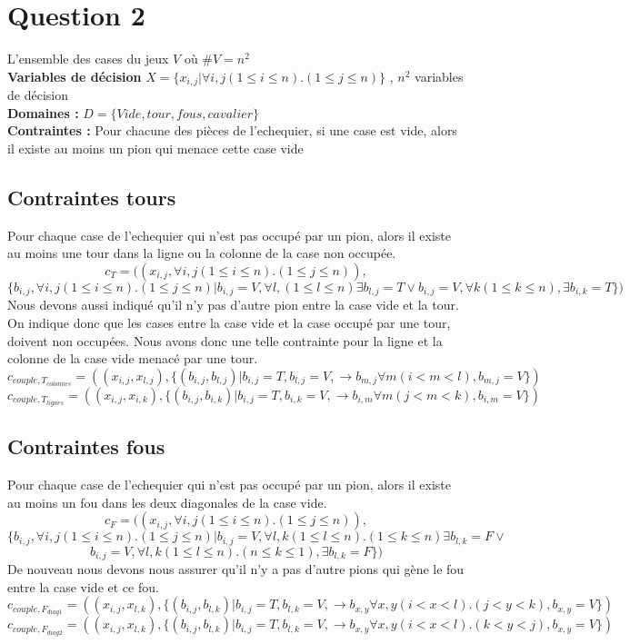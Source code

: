 \documentclass[a4paper,10pt]{article}
\begin{document}
\section{Question 2}
L'ensemble des cases du jeux $V$ où $ \#V = n^2$ \\
\textbf {Variables de décision} $ X = \{x_{i,j} | \forall i,j (1 \leq i \leq n).(1 \leq j \leq n)\}$ , $n^2$ variables de décision \\
\textbf{Domaines : }
$ D = \{Vide, tour, fous, cavalier \} $\\
\textbf{Contraintes : } Pour chacune des pièces de l'echequier, si une case est vide, alors il existe au moins un pion qui menace cette case vide

\subsection{Contraintes tours}
	Pour chaque case de l'echequier qui n'est pas occupé par un pion, alors il existe au moins une tour dans la ligne ou la colonne de la case non occupée.
$$ c_T = ((x_{i,j}, \forall i,j (1 \leq i \leq n).(1 \leq j \leq n)),$$ $$\{b_{i,j}, \forall i,j (1 \leq i \leq n).(1 \leq j \leq n)|b_{i,j} = V, \forall l, (1 \leq l \leq n) \exists b_{l,j} = T \lor b_{i,j} = V, \forall k (1 \leq k \leq n), \exists b_{i,k} = T\})  $$
	Nous devons aussi indiqué qu'il n'y pas d'autre pion entre la case vide et la tour.  On indique donc que les cases entre la case vide et la case occupé par une tour, doivent non occupées. Nous avons donc une telle contrainte pour la ligne et la colonne de la case vide menacé par une tour.
$$ c_{couple,T_{colonnes}} = ((x_{i,j}, x_{l,j}), \{(b_{i,j}, b_{l,j})|b_{i,j} = T, b_{l,j} = V, \rightarrow b_{m,j} \forall m (i < m < l), b_{m,j} = V \})$$
$$ c_{couple,T_{lignes}} = ((x_{i,j}, x_{i,k}), \{(b_{i,j}, b_{i,k})|b_{i,j} = T, b_{i,k} = V, \rightarrow b_{i,m} \forall m (j < m < k), b_{i,m} = V \})$$

\subsection{Contraintes fous}
	Pour chaque case de l'echequier qui n'est pas occupé par un pion, alors il existe au moins un fou dans les deux diagonales de la case vide.
$$ c_F = ((x_{i,j}, \forall i,j (1 \leq i \leq n).(1 \leq j \leq n)),$$ $$\{b_{i,j},\forall i,j (1 \leq i \leq n).(1 \leq j \leq n)|b_{i,j} = V, \forall l,k (1 \leq l \leq n).(1 \leq k \leq n) \exists b_{l,k} = F \lor$$ $$b_{i,j} = V, \forall l,k (1 \leq l \leq n).(n \leq k \leq 1), \exists b_{l,k} = F\})  $$
	De nouveau nous devons nous assurer qu'il n'y a pas d'autre pions qui gène le fou entre la case vide et ce fou.
$$ c_{couple,F_{diag1}} = ((x_{i,j}, x_{l,k}), \{(b_{i,j}, b_{l,k})|b_{i,j} = T, b_{l,k} = V, \rightarrow b_{x,y} \forall x,y (i < x < l).(j < y < k), b_{x,y} = V \})$$
$$ c_{couple,F_{diag2}} = ((x_{i,j}, x_{l,k}), \{(b_{i,j}, b_{l,k})|b_{i,j} = T, b_{l,k} = V, \rightarrow b_{x,y} \forall x,y (i < x < l).(k < y < j), b_{x,y} = V \})$$
\end{document}
